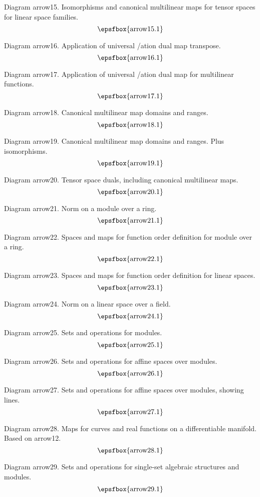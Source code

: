 Diagram arrow15. Isomorphisms and canonical multilinear maps for tensor spaces
for linear space families.
$$
\centerline{\epsfbox{arrow15.1}}
$$

Diagram arrow16. Application of universal \factoris/ation dual map transpose.
$$
\centerline{\epsfbox{arrow16.1}}
$$

Diagram arrow17. Application of universal \factoris/ation dual map for
multilinear functions.
$$
\centerline{\epsfbox{arrow17.1}}
$$

\filleject

Diagram arrow18. Canonical multilinear map domains and ranges.
$$
\centerline{\epsfbox{arrow18.1}}
$$

Diagram arrow19. Canonical multilinear map domains and ranges. Plus
isomorphisms.
$$
\centerline{\epsfbox{arrow19.1}}
$$

Diagram arrow20. Tensor space duals, including canonical multilinear maps.
$$
\centerline{\epsfbox{arrow20.1}}
$$

Diagram arrow21. Norm on a module over a ring.
$$
\centerline{\epsfbox{arrow21.1}}
$$

Diagram arrow22. Spaces and maps for function order definition for module over a
ring.
$$
\centerline{\epsfbox{arrow22.1}}
$$

Diagram arrow23. Spaces and maps for function order definition for linear
spaces.
$$
\centerline{\epsfbox{arrow23.1}}
$$

\filleject

Diagram arrow24. Norm on a linear space over a field.
$$
\centerline{\epsfbox{arrow24.1}}
$$

Diagram arrow25. Sets and operations for modules.
$$
\centerline{\epsfbox{arrow25.1}}
$$

Diagram arrow26. Sets and operations for affine spaces over modules.
$$
\centerline{\epsfbox{arrow26.1}}
$$

Diagram arrow27. Sets and operations for affine spaces over modules, showing
lines.
$$
\centerline{\epsfbox{arrow27.1}}
$$

\filleject

Diagram arrow28. Maps for curves and real functions on a differentiable
manifold. Based on arrow12.
$$
\centerline{\epsfbox{arrow28.1}}
$$

Diagram arrow29. Sets and operations for single-set algebraic structures and
modules.
$$
\centerline{\epsfbox{arrow29.1}}
$$

